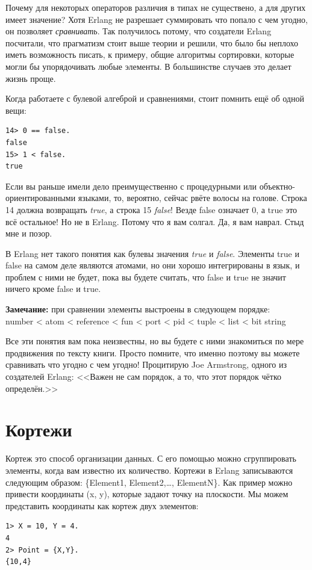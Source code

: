 \documentclass[a4paper,12pt]{report}
\newcommand{\ops}{\colorbox{lgreen}}
\begin{document}
Почему для некоторых операторов различия в типах не существено, а для других имеет значение? Хотя Erlang не разрешает суммировать что попало с чем угодно, он позволяет \emph{сравнивать}. Так получилось потому, что создатели Erlang посчитали, что прагматизм стоит выше теории и решили, что было бы неплохо иметь возможность писать, к примеру, общие алгоритмы сортировки, которые могли бы упорядочивать любые элементы. В большинстве случаев это делает жизнь проще.

Когда работаете с булевой алгеброй и сравнениями, стоит помнить ещё об одной вещи:
\begin{lstlisting}[style=repl]
14> 0 == false.
false
15> 1 < false.
true
\end{lstlisting}

Если вы раньше имели дело преимущественно с процедурными или объектно\--ориентированными языками, то, вероятно, сейчас рвёте волосы на голове. Строка 14 должна возвращать \emph{true}, а строка 15 \emph{false}! Везде false означает 0, а true это всё остальное! Но не в Erlang. Потому что я вам солгал. Да, я вам наврал. Стыд мне и позор.

В Erlang нет такого понятия как булевы значения \emph{true} и \emph{false}. Элементы true и false на самом деле являются атомами, но они хорошо интегрированы в язык, и проблем с ними не будет, пока вы будете считать, что false и true не значит ничего кроме false и true.\\ 
\colorbox{lgray}
{
    \begin{minipage}{1.0\linewidth}
    \textbf{Замечание:} при сравнении элементы выстроены в следующем порядке:\\ 
    \ops{number < atom < reference < fun < port < pid < tuple < list < bit string} 
    
    Все эти понятия вам пока неизвестны, но вы будете с ними знакомиться по мере продвижения по тексту книги. Просто помните, что именно поэтому вы можете сравнивать что угодно с чем угодно! Процитирую Joe Armstrong, одного из создателей Erlang: <<Важен не сам порядок, а то, что этот порядок чётко определён.>>
    \end{minipage}
}
\section{Кортежи}
Кортеж это способ организации данных. С его помощью можно сгруппировать элементы, когда вам известно их количество. Кортежи в Erlang записываются следующим образом: \ops{\{Element1, Element2,\ldots, ElementN\}}. Как пример можно привести координаты (x, y), которые задают точку на плоскости. Мы можем представить координаты как кортеж двух элементов:
\begin{lstlisting}[style=repl]
1> X = 10, Y = 4.
4
2> Point = {X,Y}.
{10,4}
\end{lstlisting}
\end{document}
